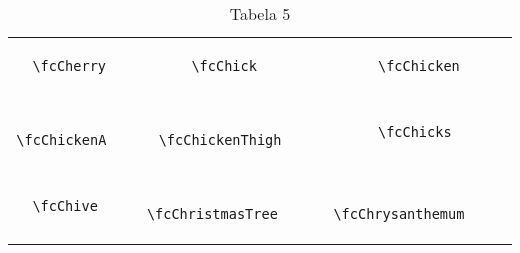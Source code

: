 \documentclass[x11names]{article}
\begin{document}
\begin{table}[H]
\begin{tabular}{|c|c|c|c|c|c|}
		&\multirow{5}{*}{	\fcCherry	[scale=0.8]} & &\multirow{5}{*}{	\fcChick	[scale=0.4]} & &\multirow{5}{*}{	\fcChicken	[scale=0.4]}\\	& & & & & \\	& & & & & \\	\verb|	\fcCherry	| & & \verb|	\fcChick	| & & \verb|	\fcChicken	| & \\	& & & & & \\	& & & & & \\	& & & & & \\	\hline									
		&\multirow{5}{*}{	\fcChickenA	[scale=0.4]} & &\multirow{5}{*}{	\fcChickenThigh	[scale=0.3]} & &\multirow{5}{*}{	\fcChicks	[scale=0.3]}\\	& & & & & \\	& & & & & \\	\verb|	\fcChickenA	| & & \verb|	\fcChickenThigh	| & & \verb|	\fcChicks	| & \\	& & & & & \\	& & & & & \\	& & & & & \\	\hline									
		&\multirow{5}{*}{	\fcChive	[scale=0.4]} & &\multirow{5}{*}{	\fcChristmasTree	[scale=0.8]} & &\multirow{5}{*}{	\fcChrysanthemum	[scale=0.4]}\\	& & & & & \\	& & & & & \\	\verb|	\fcChive	| & & \verb|	\fcChristmasTree	| & & \verb|	\fcChrysanthemum	| & \\	& & & & & \\	& & & & & \\	& & & & & \\		\hline 	\hline 	\end{tabular}	\caption{	Tabela 5	}\label{	Tab5	}\end{table}
\end{document}
